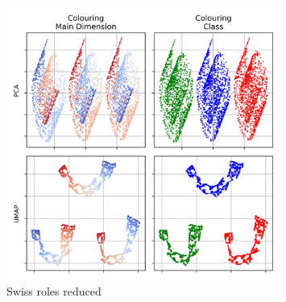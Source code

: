 \label{dim_reduction}
\begin{figure}[h]
  \centering
  \includegraphics[width=0.8\textwidth]{images/chapter_4/reduced.png}
    \caption[\textbf{PCA and UMAP reduction of Swiss rolls}]{Swiss roles reduced}
    \label{fig: swiss_reduce}
\end{figure}
\lorem

